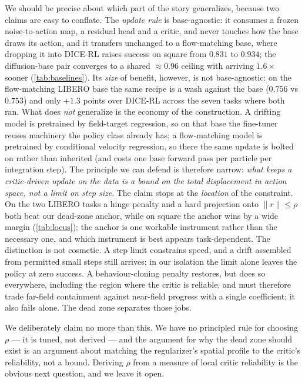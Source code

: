 We should be precise about which part of the story generalizes, because two
claims are easy to conflate. The \emph{update rule} is base-agnostic: it
consumes a frozen noise-to-action map, a residual head and a critic, and
never touches how the base draws its action, and it transfers unchanged to a
flow-matching base, where dropping it into DICE-RL raises success on square
from $0.831$ to $0.934$; the diffusion-base pair converges to a shared
${\approx}0.96$ ceiling with \method{} arriving $1.6\times$ sooner
(\cref{tab:baselines}). Its \emph{size} of benefit, however, is not base-agnostic: on the
flow-matching LIBERO base the same recipe is a wash against the base
($0.756$ vs $0.753$) and only $+1.3$ points over DICE-RL across the seven
tasks where both ran. What does \emph{not} generalize is the
economy of the construction. A drifting model is pretrained by
field-target regression, so on that base the fine-tuner reuses machinery
the policy class already has; a flow-matching model is pretrained by
conditional velocity regression, so there the same update is bolted on
rather than inherited (and costs one base forward pass per particle per
integration step). The principle we can defend is therefore narrow: \emph{what keeps a
critic-driven update on the data is a bound on the total displacement in
action space, not a limit on step size}. The claim stops at the \emph{location} of the constraint. On the two LIBERO tasks a hinge
penalty and a hard projection onto $\|r\|\le\rho$ both beat our dead-zone
anchor, while on square the anchor wins by a wide margin
(\cref{tab:locus}); the anchor is one workable instrument rather than the
necessary one, and which instrument is best appears task-dependent. The distinction is not cosmetic. A step limit constrains
speed, and a drift assembled from permitted small steps still arrives; in our
isolation the limit alone leaves the policy at zero success. A
behaviour-cloning penalty restores, but does so everywhere, including the
region where the critic is reliable, and must therefore trade far-field
containment against near-field progress with a single coefficient; it also
fails alone. The dead zone separates those jobs.

We deliberately claim no more than this. We have no principled rule for
choosing $\rho$ --- it is tuned, not derived --- and the argument for why the
dead zone should exist is an argument about matching the regularizer's
spatial profile to the critic's reliability, not a bound. Deriving $\rho$
from a measure of local critic reliability is the obvious next question, and
we leave it open.
